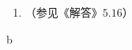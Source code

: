 \begin{enumerate}[label=\textbf{3.\arabic*}, leftmargin=-0.5mm]
\item
（参见《解答》$5.16$）

\end{enumerate}


b